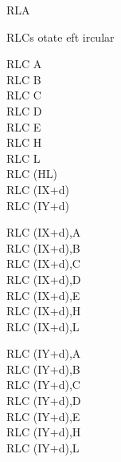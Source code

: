\begin{basedescript}{
	\desclabelstyle{\multilinelabel}
	\desclabelwidth{3cm}}
\begin{DetailItem}{RLA}{}
		\begin{DetailEffectsFlags}
		\end{DetailEffectsFlags}

		\begin{DetailTiming}
		\end{DetailTiming}

	\end{DetailItem}

	\pagebreak


	\begin{DetailItem}{RLC}{s}
		{otate eft ircular}
		{}

		\begin{DetailVariants}
			RLC A\\
			RLC B\\
			RLC C\\
			RLC D\\
			RLC E\\
			RLC H\\
			RLC L\\
			RLC (HL)\\
			RLC (IX+d)\\
			RLC (IY+d)

			\columnbreak
			RLC (IX+d),A\UNDOC\\
			RLC (IX+d),B\UNDOC\\
			RLC (IX+d),C\UNDOC\\
			RLC (IX+d),D\UNDOC\\
			RLC (IX+d),E\UNDOC\\
			RLC (IX+d),H\UNDOC\\
			RLC (IX+d),L\UNDOC

			\columnbreak
			RLC (IY+d),A\UNDOC\\
			RLC (IY+d),B\UNDOC\\
			RLC (IY+d),C\UNDOC\\
			RLC (IY+d),D\UNDOC\\
			RLC (IY+d),E\UNDOC\\
			RLC (IY+d),H\UNDOC\\
			RLC (IY+d),L\UNDOC
		\end{DetailVariants}


\end{DetailItem}
\end{basedescript}
